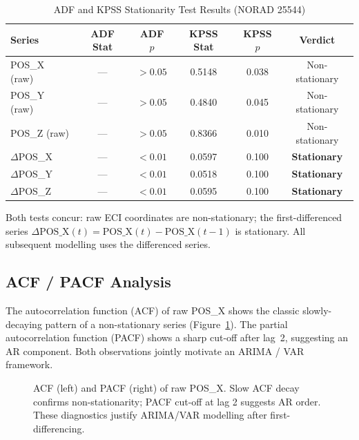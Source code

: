 \documentclass[conference]{IEEEtran}
\begin{document}
\begin{table}[H]
\centering
\caption{ADF and KPSS Stationarity Test Results (NORAD 25544)}
\label{tab:stationarity}
\begin{tabular}{lccccc}
\toprule
\textbf{Series} & \textbf{ADF Stat} & \textbf{ADF $p$} & \textbf{KPSS Stat} & \textbf{KPSS $p$} & \textbf{Verdict} \\
\midrule
POS\_X (raw)      & ---  & $>0.05$ & 0.5148 & 0.038 & Non-stationary \\
POS\_Y (raw)      & ---  & $>0.05$ & 0.4840 & 0.045 & Non-stationary \\
POS\_Z (raw)      & ---  & $>0.05$ & 0.8366 & 0.010 & Non-stationary \\
$\Delta$POS\_X    & ---  & $<0.01$ & 0.0597 & 0.100 & \textbf{Stationary} \\
$\Delta$POS\_Y    & ---  & $<0.01$ & 0.0518 & 0.100 & \textbf{Stationary} \\
$\Delta$POS\_Z    & ---  & $<0.01$ & 0.0595 & 0.100 & \textbf{Stationary} \\
\bottomrule
\end{tabular}
\end{table}

Both tests concur: raw ECI coordinates are non-stationary; the
first-differenced series $\Delta\text{POS\_X}(t) = \text{POS\_X}(t) -
\text{POS\_X}(t{-}1)$ is stationary. All subsequent modelling uses the
differenced series.

\subsection{ACF / PACF Analysis}

The autocorrelation function (ACF) of raw POS\_X shows the classic
slowly-decaying pattern of a non-stationary series
(Figure~\ref{fig:acf_pacf}). The partial autocorrelation function (PACF)
shows a sharp cut-off after lag~2, suggesting an AR component. Both
observations jointly motivate an ARIMA / VAR framework.

\begin{figure}[H]
  \centering
  \fbox{\rule{0pt}{3.5cm}\rule{\linewidth}{0pt}}
  \caption{ACF (left) and PACF (right) of raw POS\_X. Slow ACF decay
           confirms non-stationarity; PACF cut-off at lag 2 suggests AR
           order. These diagnostics justify ARIMA/VAR modelling after
           first-differencing.}
  \label{fig:acf_pacf}
\end{figure}
\end{document}
